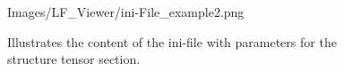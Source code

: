 \begin{figure}[htb]
	\begin{minipage}[h]{\textwidth}
		\centering
		\begin{overpic}[width=0.9\linewidth]{Images/LF_Viewer/ini-File_example2.png}
		\end{overpic}
	\end{minipage}
	\caption{Illustrates the content of the ini-file with parameters for the structure tensor section.}
	\label{figure_INI_example2}
\end{figure}
